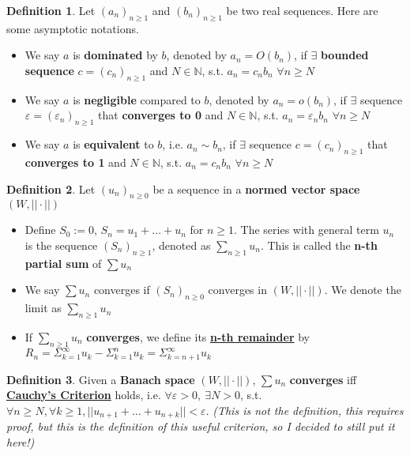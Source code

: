 \documentclass[12pt,a4paper]{article}
\theoremstyle{definition}
\newtheorem{defin}{Definition}[subsection]
\newenvironment{definition}{
  \begin{defin}
}{
  \end{defin}
  \vspace{0.125em}
}
\begin{document}
\begin{definition}
  Let $(a_n)_{n \geq 1}$ and $(b_n)_{n \geq 1}$ be two real sequences. Here are some asymptotic notations.
  \begin{itemize}
    \item We say $a$ is \textbf{dominated} by $b$, denoted by $\boxed{a_n = O(b_n)}$, if $\exists$ \textbf{bounded sequence} $c = (c_n)_{n \geq 1}$ and $N \in \mathbb{N}$, s.t. \underline{$a_n = c_n b_n$} $\forall n \geq N$
    \item We say $a$ is \textbf{negligible} compared to $b$, denoted by $\boxed{a_n = o(b_n)}$, if $\exists$ sequence $\varepsilon = (\varepsilon_n)_{n \geq 1}$ that \textbf{converges to 0} and $N \in \mathbb{N}$, s.t. \underline{$a_n = \varepsilon_n b_n$} $\forall n \geq N$
    \item We say $a$ is \textbf{equivalent} to $b$, i.e. $\boxed{a_n \sim b_n}$, if $\exists$ sequence $c = (c_n)_{n \geq 1}$ that \textbf{converges to 1} and $N \in \mathbb{N}$, s.t. \underline{$a_n = c_n b_n$} $\forall n \geq N$
  \end{itemize}
\end{definition}

\begin{definition}
  Let $(u_n)_{n \geq 0}$ be a sequence in a \textbf{normed vector space} $(W, ||\cdot||)$
  \begin{itemize}
    \item Define $S_0 := 0$, $S_n = u_1 + \dots + u_n$ for $n \geq 1$. The series with general term $u_n$ is the sequence $(S_n)_{n \geq 1}$, denoted as \underline{$\sum_{n \geq 1} u_n$}. This is called the \textbf{n-th partial sum} of $\sum u_n$
    \item We say $\sum u_n$ converges if $(S_n)_{n \geq 0}$ converges in $(W, ||\cdot||)$. We denote the limit as $\sum_{n \geq 1} u_n$
    \item If $\sum_{n \geq 1} u_n$ \textbf{converges}, we define its \underline{\textbf{n-th remainder}} by $\boxed{R_n = \Sigma_{k = 1}^\infty u_k - \Sigma_{k = 1}^n u_k = \Sigma_{k = n + 1}^\infty u_k}$
  \end{itemize}
\end{definition}

\begin{definition}
  Given a \textbf{Banach space} $(W, ||\cdot||)$, $\sum u_n$ \textbf{converges} iff \underline{\textbf{Cauchy's Criterion}} holds, i.e. $\forall \varepsilon > 0,\ \exists N > 0$, s.t. $\forall n \geq N, \forall k \geq 1, \boxed{||u_{n + 1} + \dots + u_{n + k}|| < \varepsilon}$. \textit{(This is not the definition, this requires proof, but this is the definition of this useful criterion, so I decided to still put it here!)}
\end{definition}
\end{document}
